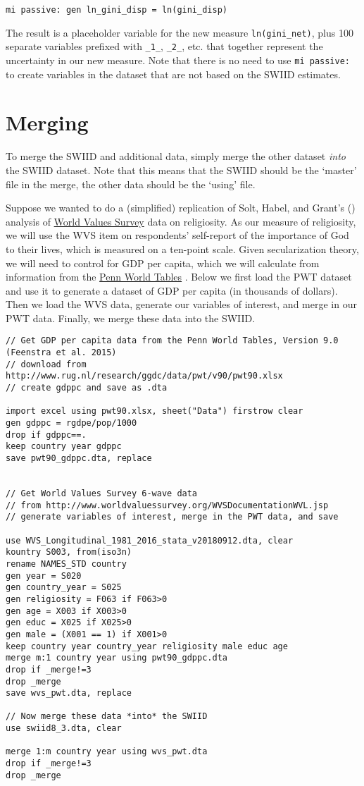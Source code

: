 \documentclass[11pt]{article}
\begin{document}
\begin{verbatim}
mi passive: gen ln_gini_disp = ln(gini_disp)
\end{verbatim}

The result is a placeholder variable for the new measure \verb+ln(gini_net)+, plus 100 separate variables prefixed with \verb+_1_+, \verb+_2_+, etc. that together represent the uncertainty in our new measure.  Note that there is no need to use \verb+mi passive:+ to create variables in the dataset that are not based on the SWIID estimates.

\section{Merging}
To merge the SWIID and additional data, simply merge the other dataset \emph{into} the SWIID dataset.  Note that this means that the SWIID should be the `master' file in the merge, the other data should be the `using' file. 

Suppose we wanted to do a (simplified) replication of Solt, Habel, and Grant's (\citeyear{Solt2011a}) analysis of \href{http://worldvaluessurvey.org}{World Values Survey} data on religiosity.  As our measure of religiosity, we will use the WVS item on respondents' self-report of the importance of God to their lives, which is measured on a ten-point scale.  Given secularization theory, we will need to control for GDP per capita, which we will calculate from information from the \href{www.ggdc.net/pwt}{Penn World Tables} \citep{Feenstra2015}.  Below we first load the PWT dataset and use it to generate a dataset of GDP per capita (in thousands of dollars).  Then we load the WVS data, generate our variables of interest, and merge in our PWT data.  Finally, we merge these data into the SWIID.

\begin{verbatim}
// Get GDP per capita data from the Penn World Tables, Version 9.0 (Feenstra et al. 2015)
// download from http://www.rug.nl/research/ggdc/data/pwt/v90/pwt90.xlsx
// create gdppc and save as .dta

import excel using pwt90.xlsx, sheet("Data") firstrow clear
gen gdppc = rgdpe/pop/1000
drop if gdppc==.
keep country year gdppc
save pwt90_gdppc.dta, replace


// Get World Values Survey 6-wave data 
// from http://www.worldvaluessurvey.org/WVSDocumentationWVL.jsp
// generate variables of interest, merge in the PWT data, and save

use WVS_Longitudinal_1981_2016_stata_v20180912.dta, clear
kountry S003, from(iso3n)
rename NAMES_STD country
gen year = S020
gen country_year = S025 
gen religiosity = F063 if F063>0
gen age = X003 if X003>0
gen educ = X025 if X025>0
gen male = (X001 == 1) if X001>0
keep country year country_year religiosity male educ age
merge m:1 country year using pwt90_gdppc.dta
drop if _merge!=3
drop _merge
save wvs_pwt.dta, replace

// Now merge these data *into* the SWIID
use swiid8_3.dta, clear

merge 1:m country year using wvs_pwt.dta
drop if _merge!=3
drop _merge

\end{verbatim}
\end{document}
